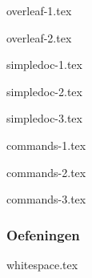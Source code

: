 \documentclass[allauthors,dutch]{../../../cursuspresentatie}
\def\importslide#1#2{%
	{#2}
}
\begin{document}
\begin{frame}
\begin{tabular}{p{6cm} p{7cm}}
	\end{tabular}
\end{frame}

\importslide{beginners_NL}{overleaf-1.tex}
\importslide{beginners_NL}{overleaf-2.tex}


\importslide{beginners_NL}{simpledoc-1.tex}
\importslide{beginners_NL}{simpledoc-2.tex}
\importslide{beginners_NL}{simpledoc-3.tex}


\importslide{beginners_NL}{commands-1.tex}
\importslide{beginners_NL}{commands-2.tex}
\importslide{beginners_NL}{commands-3.tex}


\begin{frame}
	\frametitle{Oefeningen}
	
	\centering
	
\end{frame}


\importslide{beginners_NL}{whitespace.tex}
\end{document}
